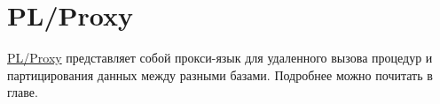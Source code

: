\section{PL/Proxy}

\href{http://pgfoundry.org/projects/plproxy/}{PL/Proxy} представляет собой прокси-язык для удаленного вызова процедур и партицирования данных между разными базами. Подробнее можно почитать в  главе.